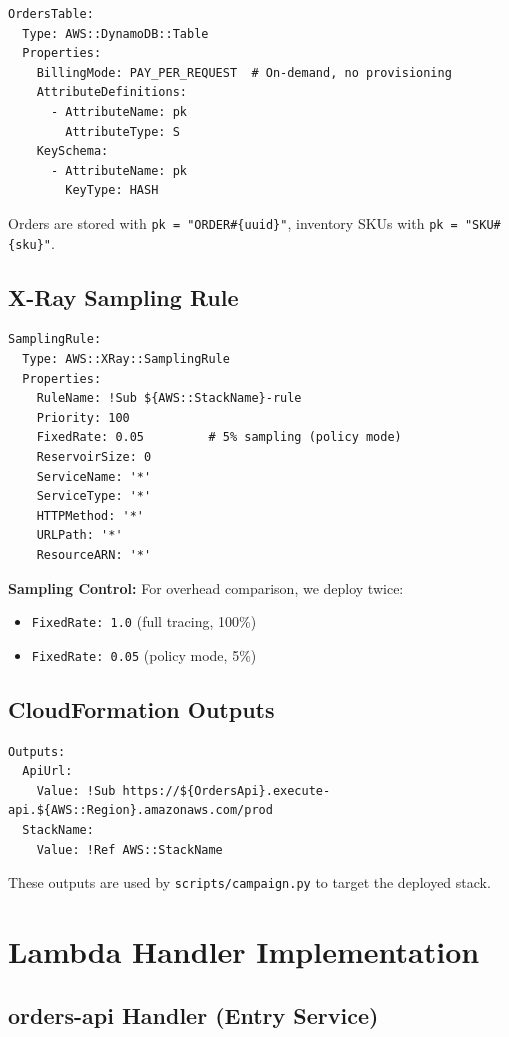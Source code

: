 \begin{verbatim}
OrdersTable:
  Type: AWS::DynamoDB::Table
  Properties:
    BillingMode: PAY_PER_REQUEST  # On-demand, no provisioning
    AttributeDefinitions:
      - AttributeName: pk
        AttributeType: S
    KeySchema:
      - AttributeName: pk
        KeyType: HASH
\end{verbatim}

Orders are stored with \texttt{pk = "ORDER\#\{uuid\}"}, inventory SKUs with \texttt{pk = "SKU\#\{sku\}"}.

\subsection{X-Ray Sampling Rule}

\begin{verbatim}
SamplingRule:
  Type: AWS::XRay::SamplingRule
  Properties:
    RuleName: !Sub ${AWS::StackName}-rule
    Priority: 100
    FixedRate: 0.05         # 5% sampling (policy mode)
    ReservoirSize: 0
    ServiceName: '*'
    ServiceType: '*'
    HTTPMethod: '*'
    URLPath: '*'
    ResourceARN: '*'
\end{verbatim}

\textbf{Sampling Control:} For overhead comparison, we deploy twice:
\begin{itemize}
    \item \texttt{FixedRate: 1.0} (full tracing, 100\%)
    \item \texttt{FixedRate: 0.05} (policy mode, 5\%)
\end{itemize}

\subsection{CloudFormation Outputs}

\begin{verbatim}
Outputs:
  ApiUrl:
    Value: !Sub https://${OrdersApi}.execute-api.${AWS::Region}.amazonaws.com/prod
  StackName:
    Value: !Ref AWS::StackName
\end{verbatim}

These outputs are used by \texttt{scripts/campaign.py} to target the deployed stack.

\section{Lambda Handler Implementation}

\subsection{orders-api Handler (Entry Service)}

